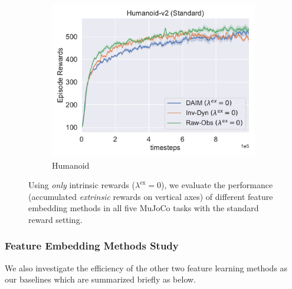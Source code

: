 \begin{figure}[h!]
\begin{subfigure}[t]{0.49\textwidth}
    \includegraphics[width=\textwidth]{figures/chapter5/r_in_only/humanoid.pdf}
    \caption{Humanoid}
  \end{subfigure}\hfill
  \caption{Using {\em only} intrinsic rewards ($\lambda^{\text{ex}}=0$), we evaluate the performance (accumulated {\it extrinsic} rewards on vertical axes) of different feature embedding methods in all five MuJoCo tasks with the standard reward setting.} 
  \label{fig:walker2d_results_r_in}
\end{figure}


\subsubsection{Feature Embedding Methods Study}
We also investigate the efficiency of the other two feature learning methods as our baselines which are summarized briefly as below.


